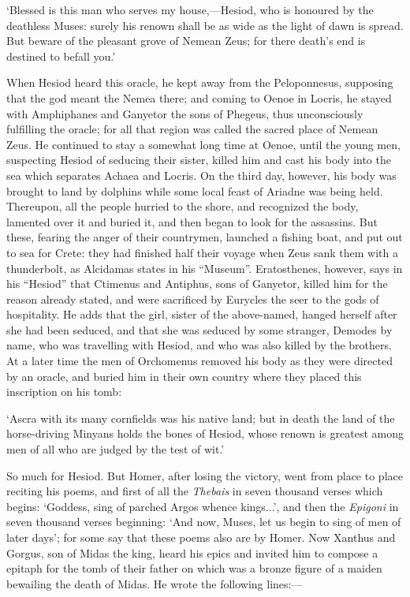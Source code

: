 ‘Blessed is this man who serves my house,—Hesiod, who is honoured
by the deathless Muses: surely his renown shall be as wide as the light of dawn
is spread. But beware of the pleasant grove of Nemean Zeus; for there
death’s end is destined to befall you.’

When Hesiod heard this oracle, he kept away from the Peloponnesus, supposing
that the god meant the Nemea there; and coming to Oenoe in Locris, he stayed
with Amphiphanes and Ganyetor the sons of Phegeus, thus unconsciously
fulfilling the oracle; for all that region was called the sacred place of
Nemean Zeus. He continued to stay a somewhat long time at Oenoe, until the
young men, suspecting Hesiod of seducing their sister, killed him and cast his
body into the sea which separates Achaea and Locris. On the third day, however,
his body was brought to land by dolphins while some local feast of Ariadne was
being held. Thereupon, all the people hurried to the shore, and recognized the
body, lamented over it and buried it, and then began to look for the assassins.
But these, fearing the anger of their countrymen, launched a fishing boat, and
put out to sea for Crete: they had finished half their voyage when Zeus sank
them with a thunderbolt, as Alcidamas states in his “Museum”.
Eratosthenes, however, says in his “Hesiod” that Ctimenus and
Antiphus, sons of Ganyetor, killed him for the reason already stated, and were
sacrificed by Eurycles the seer to the gods of hospitality. He adds that the
girl, sister of the above-named, hanged herself after she had been seduced, and
that she was seduced by some stranger, Demodes by name, who was travelling with
Hesiod, and who was also killed by the brothers. At a later time the men of
Orchomenus removed his body as they were directed by an oracle, and buried him
in their own country where they placed this inscription on his tomb:

‘Ascra with its many cornfields was his native land; but in death the
land of the horse-driving Minyans holds the bones of Hesiod, whose renown is
greatest among men of all who are judged by the test of wit.’

So much for Hesiod. But Homer, after losing the victory, went from place to
place reciting his poems, and first of all the \emph{Thebais} in seven
thousand verses which begins: ‘Goddess, sing of parched Argos whence
kings...’, and then the \emph{Epigoni} in seven thousand verses
beginning: ‘And now, Muses, let us begin to sing of men of later
days’; for some say that these poems also are by Homer. Now Xanthus and
Gorgus, son of Midas the king, heard his epics and invited him to compose a
epitaph for the tomb of their father on which was a bronze figure of a maiden
bewailing the death of Midas. He wrote the following lines:—

